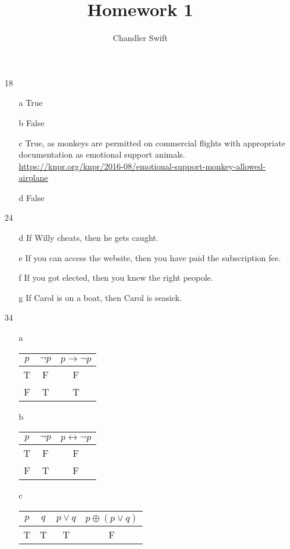 \documentclass{article}
\title{Homework 1}
\author{Chandler Swift}
\begin{document}
\maketitle
\begin{itemize}
  \item [18]
    \begin{itemize}
      \item [a] True
      \item [b] False
      \item [c] True, as monkeys are permitted on commercial flights with appropriate documentation as emotional support animals. \url{https://knpr.org/knpr/2016-08/emotional-support-monkey-allowed-airplane}
      \item [d] False
    \end{itemize}
  \item [24]
    \begin{itemize}
      \item [d] If Willy cheats, then he gets caught.
      \item [e] If you can access the website, then you have paid the subscription fee.
      \item [f] If you got elected, then you knew the right peopole.
      \item [g] If Carol is on a boat, then Carol is seasick.
    \end{itemize}
  \item [34]
    \begin{itemize}
      \item [a]
        \begin{tabular}{c | c | c}
          $p$ & $\neg p$ & $p \rightarrow \neg p$ \\
          \hline
          T & F & F \\
          F & T & T
        \end{tabular}
       \item [b]
        \begin{tabular}{c | c | c}
          $p$ & $\neg p$ & $p \leftrightarrow \neg p$ \\
          \hline
          T & F & F \\
          F & T & F
        \end{tabular}
      \item [c]
        \begin{tabular}{c | c | c | c}
          $p$ & $q$ & $p \lor q$ & $p \oplus (p \lor q)$ \\
          \hline
          T & T & T & F \\

\end{tabular}
\end{itemize}
\end{itemize}
\end{document}
